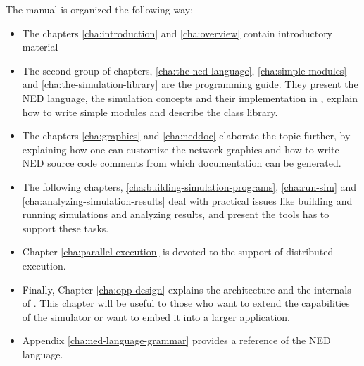 The manual is organized the following way:

\begin{itemize}
  \item{The chapters
    \ref{cha:introduction} and
    \ref{cha:overview}
    contain introductory material}
  \item{The second group of chapters,
    \ref{cha:the-ned-language},
    \ref{cha:simple-modules} and
    \ref{cha:the-simulation-library}
    are the programming guide. They present the NED language,
    the simulation concepts and their implementation in {\opp}, explain
    how to write simple modules and describe the class library.}
  \item{The chapters
    \ref{cha:graphics} and
    \ref{cha:neddoc}
    elaborate the topic further, by explaining how one can customize
    the network graphics and how to write NED source code comments
    from which documentation can be generated.}
  \item{The following chapters,
    \ref{cha:building-simulation-programs},
    \ref{cha:run-sim} and
    \ref{cha:analyzing-simulation-results} deal with practical issues
    like building and running simulations and analyzing results, and
    present the tools {\opp} has to support these tasks.}
  \item{Chapter \ref{cha:parallel-execution} is devoted to the support
    of distributed execution.}
  \item{Finally, Chapter \ref{cha:opp-design} explains the
    architecture and the internals of {\opp}. This chapter will be
    useful to those who want to extend the capabilities of the
    simulator or want to embed it into a larger application.}
  \item{Appendix \ref{cha:ned-language-grammar} provides a reference
    of the NED language.}
\end{itemize}




